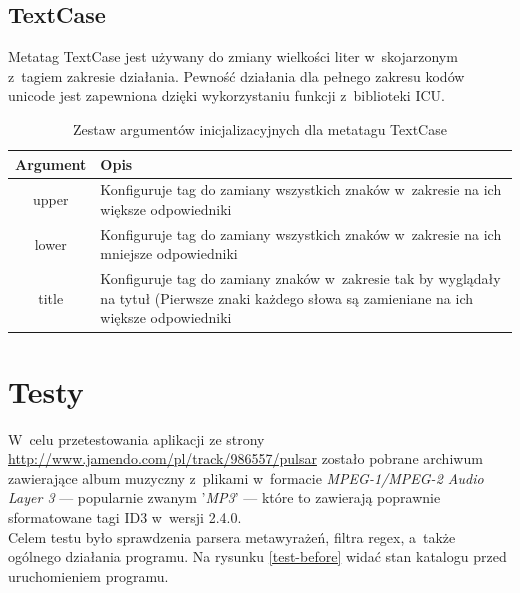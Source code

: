 \subsection{TextCase}
Metatag TextCase jest używany do zmiany wielkości liter w~skojarzonym z~tagiem zakresie działania. Pewność działania dla pełnego zakresu kodów unicode jest zapewniona dzięki wykorzystaniu funkcji z~biblioteki ICU.



\begin{table}[h]
\begin{center}
\begin{tabular}{| c | p{13cm} |}
\hline
\textbf{Argument} & \textbf{Opis} \\
\hline
upper & Konfiguruje tag do zamiany wszystkich znaków w~zakresie na ich większe odpowiedniki \\
lower & Konfiguruje tag do zamiany wszystkich znaków w~zakresie na ich mniejsze odpowiedniki \\
title & Konfiguruje tag do zamiany znaków w~zakresie tak by wyglądały na tytuł (Pierwsze znaki każdego słowa są zamieniane na ich większe odpowiedniki \\
\hline
\end{tabular} \end{center}
\caption{Zestaw argumentów inicjalizacyjnych dla metatagu TextCase}
\end{table}

\section{Testy}
\label{testy}

\par
 W~celu przetestowania aplikacji ze strony \url{http://www.jamendo.com/pl/track/986557/pulsar} zostało pobrane archiwum zawierające album muzyczny z~plikami w~formacie \textit{MPEG-1/MPEG-2 Audio Layer 3} --- popularnie zwanym '\textit{MP3}' --- które to zawierają poprawnie sformatowane tagi ID3 w~wersji 2.4.0.\\
Celem testu było sprawdzenia parsera metawyrażeń, filtra regex, a~także ogólnego działania programu.
Na rysunku \ref{test-before} widać stan katalogu przed uruchomieniem programu.

